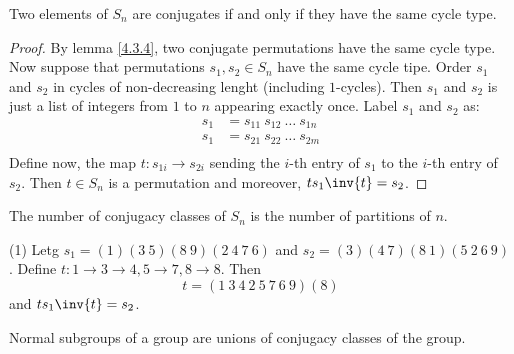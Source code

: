 \begin{lemma}\label{4.3.5}
    Two elements of $S_n$ are conjugates if and only if they have the same cycle
    type.
\end{lemma}
\begin{proof}
    By lemma \ref{4.3.4}, two conjugate permutations have the same cycle type.
    Now suppose that permutations $s_1,s_2 \in S_n$ have the same cycle tipe.
    Order $s_1$ and $s_2$ in cycles of non-decreasing lenght (including
    $1$-cycles). Then $s_1$ and $s_2$ is just a list of integers from $1$ to
    $n$ appearing exactly once. Label  $s_1$ and $s_2$ as:
    \begin{align*}
        s_1     &=      s_{11} \ s_{12} \ \dots \ s_{1n}   \\
        s_1     &=      s_{21} \ s_{22} \ \dots \ s_{2m}   \\
    \end{align*}
    Define now, the map $t:s_{1i} \xrightarrow{} s_{2i}$ sending the $i$-th
    entry of  $s_1$ to the $i$-th entry of $s_2$. Then $t \in S_n$ is a
    permutation and moreover,  $ts_1\inv{t}=s_2$.
\end{proof}
\begin{corollary}
    The number of conjugacy classes of $S_n$ is the number of partitions of
    $n$.
\end{corollary}

\begin{example}\label{}
\item[(1)] Letg $s_1=(1)(3 \ 5)(8 \ 9)(2 \ 4 \ 7 \ 6)$ and $s_2=(3)(4 \ 7)(8 \
    1)(5 \ 2 \ 6 \ 9)$. Define $t:1 \xrightarrow{} 3 \xrightarrow{} 4, 5
    \xrightarrow{} 7, 8 \xrightarrow{} 8$. Then
    \begin{equation*}
        t=(1 \ 3 \ 4 \ 2 \ 5 \ 7 \ 6 \ 9)(8)
    \end{equation*}
    and $ts_1\inv{t}=s_2$.
\end{example}

\begin{lemma}\label{4.3.6}
    Normal subgroups of a group are unions of conjugacy classes of the group.
\end{lemma}

